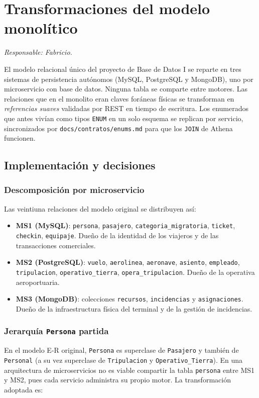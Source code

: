 \section{Transformaciones del modelo monolítico}
\label{sec:transformaciones}
\textit{Responsable: Fabricio.}

El modelo relacional único del proyecto de Base de Datos I se reparte en
tres sistemas de persistencia autónomos (MySQL, PostgreSQL y MongoDB), uno
por microservicio con base de datos. Ninguna tabla se comparte entre
motores. Las relaciones que en el monolito eran claves foráneas físicas se
transforman en \emph{referencias suaves} validadas por REST en tiempo de
escritura. Los enumerados que antes vivían como tipos \texttt{ENUM} en un
solo esquema se replican por servicio, sincronizados por
\texttt{docs/contratos/enums.md} para que los \texttt{JOIN} de Athena
funcionen.

\subsection{Implementación y decisiones}

\subsubsection{Descomposición por microservicio}
Las veintiuna relaciones del modelo original se distribuyen así:

\begin{itemize}
  \item \textbf{MS1 (MySQL)}: \texttt{persona}, \texttt{pasajero},
    \texttt{categoria\_migratoria}, \texttt{ticket}, \texttt{checkin},
    \texttt{equipaje}. Dueño de la identidad de los viajeros y de las
    transacciones comerciales.
  \item \textbf{MS2 (PostgreSQL)}: \texttt{vuelo}, \texttt{aerolinea},
    \texttt{aeronave}, \texttt{asiento}, \texttt{empleado},
    \texttt{tripulacion}, \texttt{operativo\_tierra},
    \texttt{opera\_tripulacion}. Dueño de la operativa aeroportuaria.
  \item \textbf{MS3 (MongoDB)}: colecciones \texttt{recursos},
    \texttt{incidencias} y \texttt{asignaciones}. Dueño de la
    infraestructura física del terminal y de la gestión de incidencias.
\end{itemize}

\subsubsection{Jerarquía \texttt{Persona} partida}
En el modelo E-R original, \texttt{Persona} es superclase de
\texttt{Pasajero} y también de \texttt{Personal} (a su vez superclase de
\texttt{Tripulacion} y \texttt{Operativo\_Tierra}). En una arquitectura de
microservicios no es viable compartir la tabla \texttt{persona} entre MS1
y MS2, pues cada servicio administra su propio motor. La transformación
adoptada es:

